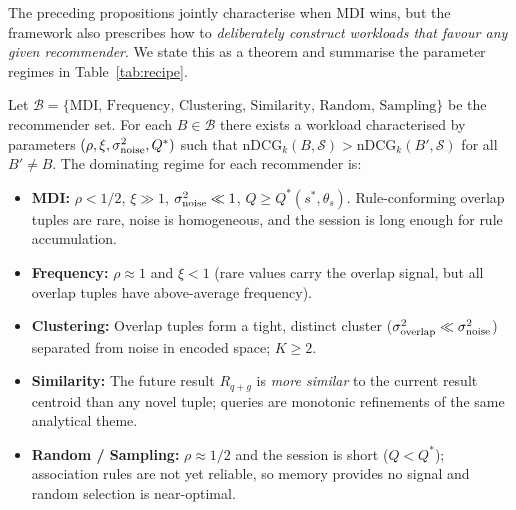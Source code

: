 The preceding propositions jointly characterise when MDI wins, but the
framework also prescribes how to \emph{deliberately construct workloads that
favour any given recommender}.  We state this as a theorem and summarise the
parameter regimes in Table~\ref{tab:recipe}.

\begin{theorem}
\label{thm:recipe}
Let $\mathcal{B} = \{\text{MDI, Frequency, Clustering, Similarity, Random,
Sampling}\}$ be the recommender set.  For each $B \in \mathcal{B}$ there
exists a workload characterised by parameters $(\rho, \xi, \sigma^2_{\rm noise},
Q^*)$ such that $\text{nDCG}_k(B, \mathcal{S}) > \text{nDCG}_k(B', \mathcal{S})$
for all $B' \neq B$.  The dominating regime for each recommender is:
\begin{itemize}
  \item \textbf{MDI:} $\rho < 1/2$, $\xi \gg 1$,
        $\sigma^2_{\rm noise} \ll 1$, $Q \geq Q^*(s^*, \theta_s)$.
        Rule-conforming overlap tuples are rare, noise is homogeneous, and
        the session is long enough for rule accumulation.

  \item \textbf{Frequency:} $\rho \approx 1$ and $\xi < 1$ (rare values carry the
        overlap signal, but all overlap tuples have above-average frequency).

  \item \textbf{Clustering:} Overlap tuples form a tight, distinct cluster
        ($\sigma^2_{\rm overlap} \ll \sigma^2_{\rm noise}$) separated from noise
        in encoded space; $K \geq 2$.

  \item \textbf{Similarity:} The future result $R_{q+g}$ is \emph{more similar}
        to the current result centroid than any novel tuple; queries are
        monotonic refinements of the same analytical theme.

  \item \textbf{Random / Sampling:} $\rho \approx 1/2$ and the session is short
        ($Q < Q^*$); association rules are not yet reliable, so memory provides
        no signal and random selection is near-optimal.
\end{itemize}
\end{theorem}

